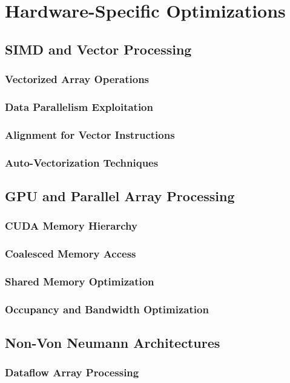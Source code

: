 \documentclass[12pt, oneside]{book}
\begin{document}
\section{Hardware-Specific Optimizations}
\subsection{SIMD and Vector Processing}
\subsubsection{Vectorized Array Operations}
\subsubsection{Data Parallelism Exploitation}
\subsubsection{Alignment for Vector Instructions}
\subsubsection{Auto-Vectorization Techniques}

\subsection{GPU and Parallel Array Processing}
\subsubsection{CUDA Memory Hierarchy}
\subsubsection{Coalesced Memory Access}
\subsubsection{Shared Memory Optimization}
\subsubsection{Occupancy and Bandwidth Optimization}

\subsection{Non-Von Neumann Architectures}
\subsubsection{Dataflow Array Processing}
\end{document}
